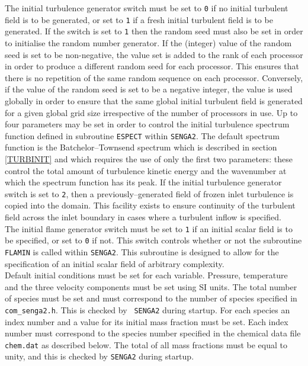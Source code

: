 \documentclass[dvips]{article}
\begin{document}
\noindent
The initial turbulence generator switch must be set to {\tt 0} if no initial
turbulent field is to be generated, or set to {\tt 1} if a fresh initial
turbulent field is to be generated.
If the switch is set to {\tt 1}
then the random seed must also be set in order to initialise the random
number generator.  If the (integer) value of the
random seed is set to be non-negative, the value set is
added to the rank of each processor in order to produce a different
random seed for each processor.  This ensures that there is no
repetition of the same random sequence on each processor.  Conversely,
if the value of the random
seed is set to be a negative integer, the value is used globally in order to
ensure
that the same global initial turbulent field is generated for a given global
grid size irrespective of the number of processors in use.
Up to four parameters may be set in order to control the initial turbulence
spectrum function defined in subroutine {\tt ESPECT} within {\tt SENGA2}.
The default spectrum function is the Batchelor--Townsend spectrum
\cite{BatchelorTownsend} which is described in section \ref{TURBINIT} and which
requires the use of only the first two parameters: these control the total
amount of turbulence kinetic energy and the wavenumber at which the
spectrum function has its peak.
If the initial turbulence generator switch is set to {\tt 2}, then a
previously--generated field of frozen inlet turbulence is copied into
the domain.  This facility exists to ensure continuity of the turbulent
field across the inlet boundary in cases where a turbulent inflow is
specified.\\

\noindent
The initial flame generator
switch must be set to {\tt 1} if an initial scalar field is to be specified,
or set to {\tt 0} if not.  This switch controls whether or not the
subroutine {\tt FLAMIN} is called within {\tt SENGA2}.  This subroutine is
designed to allow for the specification of an initial scalar field of
arbitrary complexity.\\

\noindent
Default initial conditions must be set for each
variable.  Pressure, temperature and the three velocity components must be
set using SI units.  The total number of species must be set
and must correspond to the
number of species specified in {\tt com\_senga2.h}.  This is checked by {\tt
SENGA2} during startup.  For each species an index number and a value
for its initial mass fraction must be set.  Each index number must correspond
to the species number specified in the chemical data file {\tt chem.dat}
as described below.  The
total of all mass fractions must be equal to
unity, and this is checked by {\tt SENGA2} during startup.\\
\end{document}
